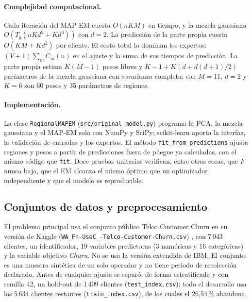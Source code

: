 \documentclass[11pt,a4paper]{article}
\begin{document}
\paragraph{Complejidad computacional.} Cada iteración del MAP-EM cuesta $O(nKM)$ en tiempo, y la mezcla gaussiana $O(T_g(nKd^2+Kd^3))$ con $d=2$. La predicción de la parte propia cuesta $O(KM+Kd^2)$ por cliente. El costo total lo dominan los expertos: $(V+1)\sum_m C_m(n)$ en el ajuste y la suma de sus tiempos de predicción. La parte propia estima $K(M-1)$ pesos libres y $K-1+K(d+d(d+1)/2)$ parámetros de la mezcla gaussiana con covarianza completa; con $M=11$, $d=2$ y $K=6$ son 60 pesos y 35 parámetros de regiones.

\paragraph{Implementación.} La clase \texttt{RegionalMAPEM} (\texttt{src/original\_model.py}) programa la PCA, la mezcla gaussiana y el MAP-EM solo con NumPy y SciPy; scikit-learn aporta la interfaz, la validación de entradas y los expertos. El método \texttt{fit\_from\_predictions} ajusta regiones y pesos a partir de predicciones fuera de pliegue ya calculadas, con el mismo código que \texttt{fit}. Doce pruebas unitarias verifican, entre otras cosas, que $F$ nunca baja, que el EM alcanza el mismo óptimo que un optimizador independiente y que el modelo es reproducible.


\subsection{Conjuntos de datos y preprocesamiento}
El problema principal usa el conjunto público Telco Customer Churn en su versión de Kaggle (\texttt{WA\_Fn-UseC\_-Telco-Customer-Churn.csv}) \cite{telco_kaggle}, con 7\,043 clientes, un identificador, 19 variables predictoras (3 numéricas y 16 categóricas) y la variable objetivo \emph{Churn}. No se usa la versión extendida de IBM. El conjunto es una muestra sintética de un solo operador y no tiene periodo de recolección declarado. Antes de cualquier ajuste se separó, de forma estratificada y con semilla 42, un hold-out de 1\,409 clientes (\texttt{test\_index.csv}); todo el desarrollo usa los 5\,634 clientes restantes (\texttt{train\_index.csv}), de los cuales el 26,54\,\% abandona.
\end{document}

